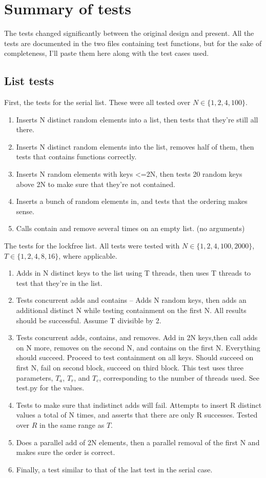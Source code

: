 \documentclass{article}
\begin{document}
\section*{Summary of tests}
The tests changed significantly between the original design and present. All the tests are documented in the two files containing test functions, but for the sake of completeness, I'll paste them here along with the test cases used.
\subsection*{List tests}
First, the tests for the serial list. These were all tested over $N\in \{1,2,4,100\}$.

\begin{enumerate}
    \item Inserts N distinct random elements into a list, then tests that they're still all there. 
    \item Inserts N distinct random elements into the list, removes half of them, then tests that contains functions correctly.
    \item Inserts N random elements with keys <=2N, then tests 20 random keys above 2N to make sure that they're not contained.
    \item Inserts a bunch of random elements in, and tests that the ordering makes sense.
    \item Calls contain and remove several times on an empty list. (no arguments)
\end{enumerate}

The tests for the lockfree list. All tests were tested with $N\in\{1,2,4,100,2000\}$, $T\in\{1,2,4,8,16\}$, where applicable.

\begin{enumerate}
    \item Adds in N distinct keys to the list using T threads, then uses T threads to test that they're in the list.
    \item Tests concurrent adds and contains -- Adds N random keys, then adds an additional distinct N while testing containment on the first N. All results should be successful. Assume T divisible by 2.
    \item Tests concurrent adds, contains, and removes. Add in 2N keys,then call adds on N more, removes on the second N, and contains on the first N. Everything should succeed. Proceed to test containment on all keys. Should succeed on first N, fail on second block, succeed on third block. This test uses three parameters, $T_a$, $T_r$, and $T_c$, corresponding to the number of threads used. See test.py for the values.
    \item Tests to make sure that indistinct adds will fail. Attempts to insert R distinct values a total of N times, and asserts that there are only R successes. Tested over $R$ in the same range as $T$.
    \item Does a parallel add of 2N elements, then a parallel removal of the first N and makes sure the order is correct.
    \item Finally, a test similar to that of the last test in the serial case.
\end{enumerate}
\end{document}
